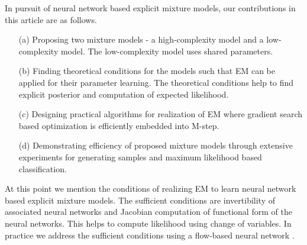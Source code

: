 

In pursuit of neural network based explicit mixture models, our contributions in this article are as follows.
\begin{enumerate}
\item[(a)] Proposing two mixture models - a high-complexity model and a low-complexity model. The low-complexity model uses shared parameters.
\item[(b)] Finding theoretical conditions for the models such that EM can be applied for their parameter learning. The theoretical conditions help to find explicit posterior and computation of expected likelihood. 
\item[(c)] Designing practical algorithms for realization of EM where gradient search based optimization is efficiently embedded into M-step.
\item[(d)] Demonstrating efficiency of proposed mixture models through extensive experiments for generating samples and maximum likelihood based classification. 
\end{enumerate}
{At this point we mention the conditions of realizing EM to learn neural network based explicit mixture models.} The sufficient conditions are invertibility of associated neural networks and Jacobian computation of functional form of the neural networks. This helps to compute likelihood using change of variables. In practice we address the sufficient conditions using a flow-based neural network \cite{2018arXiv180703039K}.











